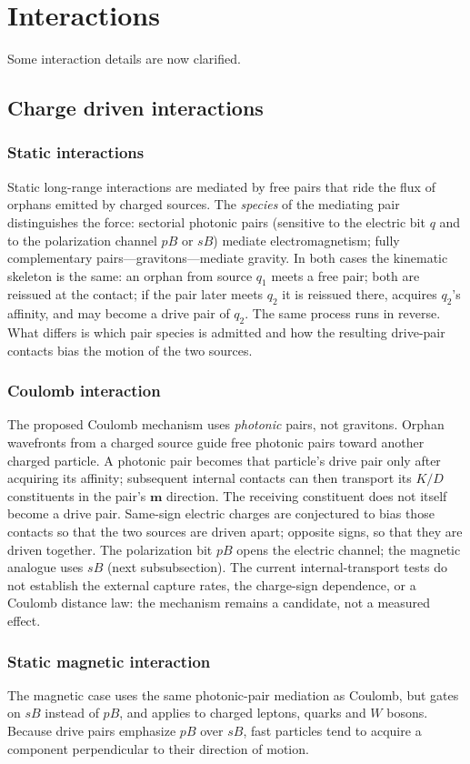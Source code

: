 \documentclass{ijuc}
\begin{document}
\section{Interactions\label{sec:Interactions}}
Some interaction details are now clarified.
\subsection{Charge driven interactions}
\subsubsection{Static interactions}
Static long-range interactions are mediated by free pairs that ride the flux of orphans emitted by charged sources. The \emph{species} of the mediating pair distinguishes the force: sectorial photonic pairs (sensitive to the electric bit $q$ and to the polarization channel $pB$ or $sB$) mediate electromagnetism; fully complementary pairs---gravitons---mediate gravity. In both cases the kinematic skeleton is the same: an orphan from source $q_1$ meets a free pair; both are reissued at the contact; if the pair later meets $q_2$ it is reissued there, acquires $q_2$'s affinity, and may become a drive pair of $q_2$. The same process runs in reverse. What differs is which pair species is admitted and how the resulting drive-pair contacts bias the motion of the two sources.
\subsubsection{Coulomb interaction} \label{subsec:Coulomb-interaction}
The proposed Coulomb mechanism uses \emph{photonic} pairs, not gravitons. Orphan wavefronts from a charged source guide free photonic pairs toward another charged particle. A photonic pair becomes that particle's drive pair only after acquiring its affinity; subsequent internal contacts can then transport its $K/D$ constituents in the pair's $\boldsymbol{m}$ direction. The receiving constituent does not itself become a drive pair. Same-sign electric charges are conjectured to bias those contacts so that the two sources are driven apart; opposite signs, so that they are driven together. The polarization bit $pB$ opens the electric channel; the magnetic analogue uses $sB$ (next subsubsection). The current internal-transport tests do not establish the external capture rates, the charge-sign dependence, or a Coulomb distance law: the mechanism remains a candidate, not a measured effect.
\subsubsection{Static magnetic interaction}
The magnetic case uses the same photonic-pair mediation as Coulomb, but gates on $sB$ instead of $pB$, and applies to charged leptons, quarks and $W$ bosons. Because drive pairs emphasize $pB$ over $sB$, fast particles tend to acquire a component perpendicular to their direction of motion.
\end{document}
